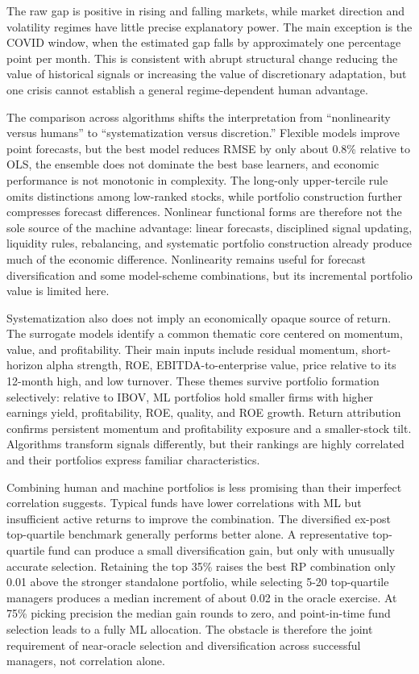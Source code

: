 \documentclass[preprint,12pt,authoryear]{elsarticle}
\begin{document}
 The raw gap is positive in rising and falling markets, while market direction and volatility regimes have little precise explanatory power. The main exception is the COVID window, when the estimated gap falls by approximately one percentage point per month. This is consistent with abrupt structural change reducing the value of historical signals or increasing the value of discretionary adaptation, but one crisis cannot establish a general regime-dependent human advantage.

The comparison across algorithms shifts the interpretation from ``nonlinearity versus humans'' to ``systematization versus discretion.'' Flexible models improve point forecasts, but the best model reduces RMSE by only about 0.8\% relative to OLS, the ensemble does not dominate the best base learners, and economic performance is not monotonic in complexity. The long-only upper-tercile rule omits distinctions among low-ranked stocks, while portfolio construction further compresses forecast differences. Nonlinear functional forms are therefore not the sole source of the machine advantage: linear forecasts, disciplined signal updating, liquidity rules, rebalancing, and systematic portfolio construction already produce much of the economic difference. Nonlinearity remains useful for forecast diversification and some model-scheme combinations, but its incremental portfolio value is limited here.

Systematization also does not imply an economically opaque source of return. The surrogate models identify a common thematic core centered on momentum, value, and profitability. Their main inputs include residual momentum, short-horizon alpha strength, ROE, EBITDA-to-enterprise value, price relative to its 12-month high, and low turnover. These themes survive portfolio formation selectively: relative to IBOV, ML portfolios hold smaller firms with higher earnings yield, profitability, ROE, quality, and ROE growth. Return attribution confirms persistent momentum and profitability exposure and a smaller-stock tilt. Algorithms transform signals differently, but their rankings are highly correlated and their portfolios express familiar characteristics.

Combining human and machine portfolios is less promising than their imperfect correlation suggests. Typical funds have lower correlations with ML but insufficient active returns to improve the combination. The diversified ex-post top-quartile benchmark generally performs better alone. A representative top-quartile fund can produce a small diversification gain, but only with unusually accurate selection. Retaining the top 35\% raises the best RP combination only 0.01 above the stronger standalone portfolio, while selecting 5-20 top-quartile managers produces a median increment of about 0.02 in the oracle exercise. At 75\% picking precision the median gain rounds to zero, and point-in-time fund selection leads to a fully ML allocation. The obstacle is therefore the joint requirement of near-oracle selection and diversification across successful managers, not correlation alone.
\end{document}
